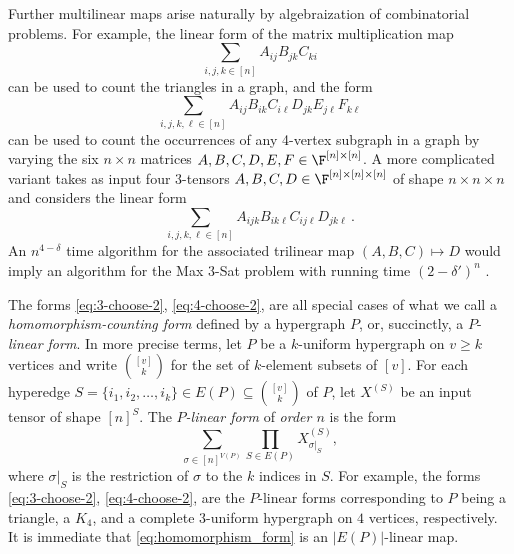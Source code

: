 Further multilinear %
%
maps
%
arise
naturally by algebraization of combinatorial problems. For example,
the linear form of the matrix multiplication map
\begin{equation}
\label{eq:3-choose-2}
\sum_{i,j,k\in [n]}A_{ij}B_{jk}C_{ki}
\end{equation}
can be used to count the %
triangles in a graph, and the form
\begin{equation}
\label{eq:4-choose-2}
\sum_{i,j,k,\ell\in [n]}
A_{ij}B_{ik}C_{i\ell}D_{jk}E_{j\ell}F_{k\ell}
\end{equation}
can be used to count the %
occurrences of any 4-vertex subgraph in
a graph by varying the six $n\times n$ matrices
$A,B,C,D,E,F\in\F^{[n]\times [n]}$. A more complicated
variant takes as input four $3$-tensors
$A, B, C, D \in\F^{[n]\times [n]\times [n]}$
of shape $n\times n\times n$ and considers the linear form
\begin{equation}
\label{eq:4-choose-3}
\sum_{i,j,k,\ell\in [n]}
A_{ijk}B_{ik\ell}C_{ij\ell}D_{jk\ell}\,.
\end{equation}
An $n^{4-\delta}$ time algorithm for the associated trilinear map $(A, B, C) \mapsto D$ would imply an algorithm for the Max 3-Sat problem with running time $(2-\delta')^n$ \cite{Williams2005}.

The forms \eqref{eq:3-choose-2}, \eqref{eq:4-choose-2},  are all special cases of what we call a \emph{homomorphism-counting form}
defined by a hypergraph $P$, or, succinctly, a $P$-\emph{linear form}.
In more precise terms, let $P$ be a $k$-uniform hypergraph on $v \ge k$ vertices and write $\binom{[v]}{k}$ for the set of $k$-element subsets of $[v]$.  For each hyperedge $S=\{i_1,i_2,\ldots,i_k\} \in E(P)\subseteq \binom{[v]}{k}$ of $P$, let $X^{(S)}$ be an input tensor of shape $[n]^S$.  The \emph{$P$-linear form} of \emph{order $n$} is the form
\begin{equation} \label{eq:homomorphism_form}
\sum_{\sigma \in [n]^{V(P)}} \prod_{S \in E(P)} X^{(S)}_{\sigma|_S},
\end{equation}
where $\sigma|_S$ is the restriction of $\sigma$ to the $k$ indices in $S$.
For example, the forms \eqref{eq:3-choose-2}, \eqref{eq:4-choose-2},  are the $P$-linear forms corresponding to $P$ being a triangle, a $K_4$, and a complete $3$-uniform hypergraph on $4$ vertices, respectively.
It is immediate that \eqref{eq:homomorphism_form} is an $|E(P)|$-linear map.

